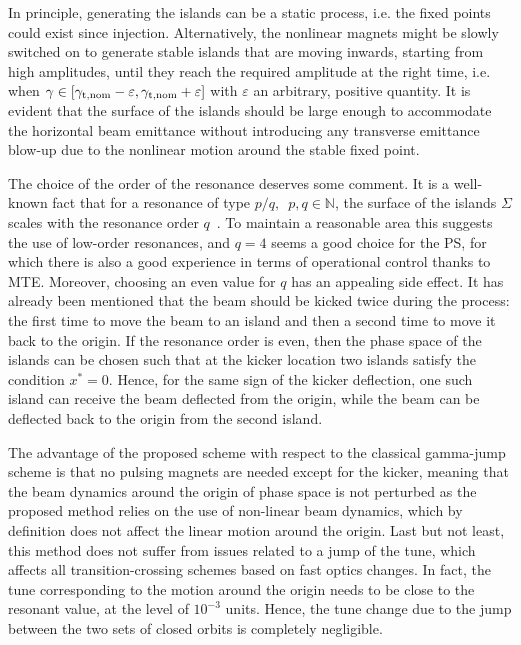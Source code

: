 \documentclass{article}
\begin{document}
In principle, generating the islands can be a static process, i.e. the fixed points could exist since injection. Alternatively, the nonlinear magnets might be slowly switched on to generate stable islands that are moving inwards, starting from high amplitudes, until they reach the required amplitude at the right time, i.e. when $\gamma \in [ \gamma_{\rm t, nom} - \varepsilon , \gamma_{\rm t, nom} + \varepsilon ] $ with $\varepsilon$ an arbitrary, positive quantity. It is evident that the surface of the islands should be large enough to accommodate the horizontal beam emittance without introducing any transverse emittance blow-up due to the nonlinear motion around the stable fixed point. 

The choice of the order of the resonance deserves some comment. It is a well-known fact that for a resonance of type $p/q, \,\,\, p,q \in \mathbb{N}$, the surface of the islands $\Sigma$ scales with the resonance order $q$~\cite{giallo}. To maintain a reasonable area this suggests the use of low-order resonances, and $q=4$ seems a good choice for the PS, for which there is also a good experience in terms of operational control thanks to MTE. Moreover, choosing an even value for $q$ has an appealing side effect. It has already been mentioned that the beam should be kicked twice during the process: the first time to move the beam to an island and then a second time to move it back to the origin. If the resonance order is even, then the phase space of the islands can be chosen such that at the kicker location two islands satisfy the condition $x^*=0$. Hence, for the same sign of the kicker deflection, one such island can receive the beam deflected from the origin, while the beam can be deflected back to the origin from the second island.

The advantage of the proposed scheme with respect to the classical gamma-jump scheme is that no pulsing magnets are needed except for the kicker, meaning that the beam dynamics around the origin of phase space is not perturbed as the proposed method relies on the use of non-linear beam dynamics, which by definition does not affect the linear motion around the origin. Last but not least, this method does not suffer from issues related to a jump of the tune, which affects all transition-crossing schemes based on fast optics changes. In fact, the tune corresponding to the motion around the origin needs to be close to the resonant value, at the level of $10^{-3}$ units. Hence, the tune change due to the jump between the two sets of closed orbits is completely negligible.
%
\end{document}
